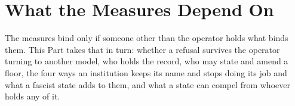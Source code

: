 \part{What the Measures Depend On}

The measures bind only if someone other than the operator holds what binds them. This Part takes that in turn: whether a refusal survives the operator turning to another model, who holds the record, who may state and amend a floor, the four ways an institution keeps its name and stops doing its job and what a fascist state adds to them, and what a state can compel from whoever holds any of it.
